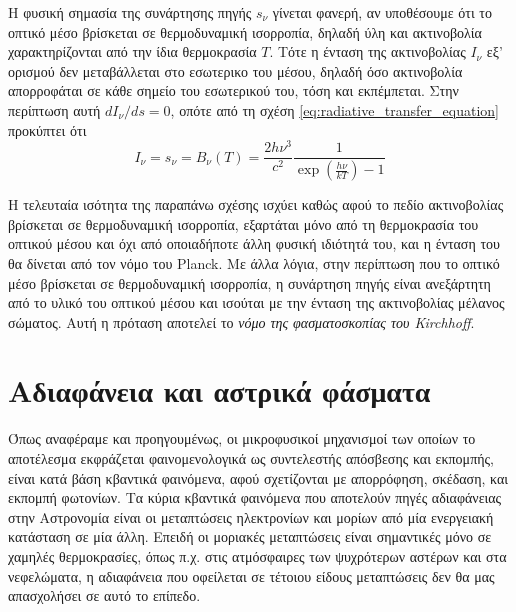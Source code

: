 Η φυσική σημασία της συνάρτησης πηγής $s_{\nu}$ γίνεται φανερή, αν υποθέσουμε ότι το οπτικό μέσο βρίσκεται σε θερμοδυναμική ισορροπία, δηλαδή ύλη και ακτινοβολία χαρακτηρίζονται από την ίδια θερμοκρασία $T$. Τότε η ένταση της ακτινοβολίας $I_{\nu}$ εξ' ορισμού δεν μεταβάλλεται στο εσωτερικο του μέσου, δηλαδή όσο ακτινοβολία απορροφάται σε κάθε σημείο του εσωτερικού του, τόση και εκπέμπεται. Στην περίπτωση αυτή $dI_{\nu}/ds = 0$, οπότε από τη σχέση \eqref{eq:radiative_transfer_equation} προκύπτει ότι 
\begin{equation}
    I_{\nu} = s_{\nu} = B_{\nu} (T) = \frac{2h \nu^3}{c^2} \frac{1}{\exp \left( \frac{h \nu}{kT} \right) - 1}
\end{equation}

Η τελευταία ισότητα της παραπάνω σχέσης ισχύει καθώς αφού το πεδίο ακτινοβολίας βρίσκεται σε θερμοδυναμική ισορροπία, εξαρτάται μόνο από τη θερμοκρασία του οπτικού μέσου και όχι από οποιαδήποτε άλλη φυσική ιδιότητά του, και η ένταση του θα δίνεται από τον νόμο του Planck. Με άλλα λόγια, στην περίπτωση που το οπτικό μέσο βρίσκεται σε θερμοδυναμική ισορροπία, η συνάρτηση πηγής είναι ανεξάρτητη από το υλικό του οπτικού μέσου και ισούται με την ένταση της ακτινοβολίας μέλανος σώματος. Αυτή η πρόταση αποτελεί το \textit{νόμο της φασματοσκοπίας του Kirchhoff}. 


\section{Αδιαφάνεια και αστρικά φάσματα}
Όπως αναφέραμε και προηγουμένως, οι μικροφυσικοί μηχανισμοί των οποίων το αποτέλεσμα εκφράζεται φαινομενολογικά ως συντελεστής απόσβεσης και εκπομπής, είναι κατά βάση κβαντικά φαινόμενα, αφού σχετίζονται με απορρόφηση, σκέδαση, και εκπομπή φωτονίων. Τα κύρια κβαντικά φαινόμενα που αποτελούν πηγές αδιαφάνειας στην Αστρονομία είναι οι μεταπτώσεις ηλεκτρονίων και μορίων από μία ενεργειακή κατάσταση σε μία άλλη. Επειδή οι μοριακές μεταπτώσεις είναι σημαντικές μόνο σε χαμηλές θερμοκρασίες, όπως π.χ. στις ατμόσφαιρες των ψυχρότερων αστέρων και στα νεφελώματα, η αδιαφάνεια που οφείλεται σε τέτοιου είδους μεταπτώσεις δεν θα μας απασχολήσει σε αυτό το επίπεδο.

